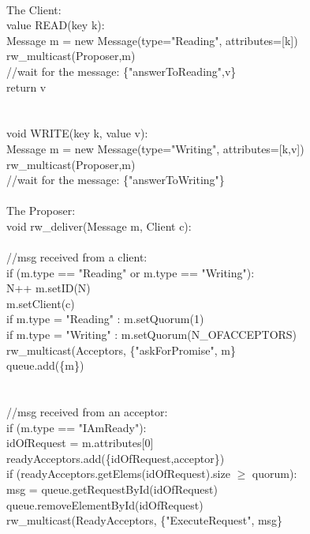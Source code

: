 \documentclass[paper=a4, fontsize=11pt]{scrartcl} %
\numberwithin{equation}{section} %
\numberwithin{figure}{section} %
\numberwithin{table}{section} %
\begin{document}
~\\
The Client:\\
{\selectfont 
value READ(key k): \\
\quad \quad Message m = new Message(type="Reading", attributes=[k]) \\
\quad \quad rw\_multicast(Proposer,m) \\
\quad \quad //wait for the message: \{"answerToReading",v\} \\
\quad \quad return v \\
~\\
~\\
void WRITE(key k, value v): \\
\quad \quad Message m = new Message(type="Writing", attributes=[k,v]) \\
\quad \quad rw\_multicast(Proposer,m) \\
\quad \quad //wait for the message: \{"answerToWriting"\} \\
}
~\\
The Proposer:\\
{\selectfont 
void rw\_deliver(Message m, Client c): \\
~\\
//msg received from a client:\\
\quad \quad if (m.type == "Reading" or m.type == "Writing"): \\
\quad \quad \quad \quad N++
\quad \quad \quad \quad m.setID(N) \\
\quad \quad \quad \quad m.setClient(c) \\
\quad \quad \quad \quad if m.type = "Reading" : m.setQuorum(1) \\
\quad \quad \quad \quad if m.type = "Writing" : m.setQuorum(N\_OFACCEPTORS) \\
\quad \quad \quad \quad rw\_multicast(Acceptors, \{"askForPromise", m\} \\
\quad \quad \quad \quad queue.add(\{m\}) \\
~\\
~\\//msg received from an acceptor:\\
\quad \quad if (m.type == "IAmReady"): \\
\quad \quad \quad \quad idOfRequest = m.attributes[0]\\
\quad \quad \quad \quad readyAcceptors.add(\{idOfRequest,acceptor\}) \\
\quad \quad \quad \quad if (readyAcceptors.getElems(idOfRequest).size $\geq$ quorum): \\
\quad \quad \quad \quad \quad msg = queue.getRequestById(idOfRequest)\\
\quad \quad \quad \quad \quad queue.removeElementById(idOfRequest)\\
\quad \quad \quad \quad \quad rw\_multicast(ReadyAcceptors, \{"ExecuteRequest", msg\} 
~\\
}
\end{document}
